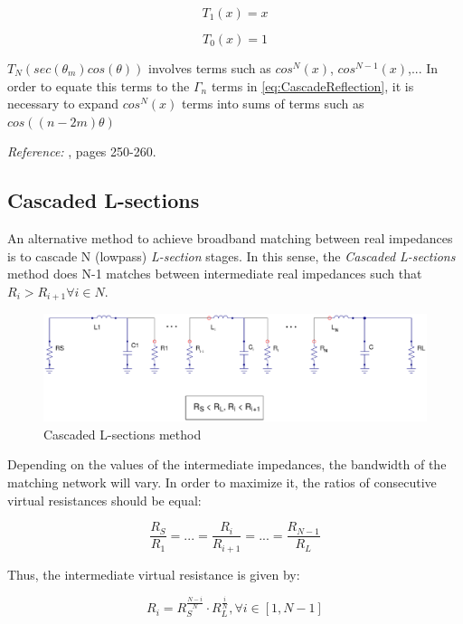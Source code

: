 \begin{equation}
T_1(x) = x
\end{equation}

\begin{equation}
T_0(x) = 1
\end{equation}

\noindent $T_N(sec(\theta_m)cos(\theta))$ involves terms such as $cos^N(x)$, $cos^{N-1}(x)$,... In order to equate this terms to the $\Gamma_n$ terms in \ref{eq:CascadeReflection}, it is necessary to expand $cos^N(x)$ terms into sums of terms such as $cos((n-2m)\theta)$

\noindent \textit{Reference:} \cite{Pozar}, pages 250-260.

\subsection{Cascaded L-sections}
An alternative method to achieve broadband matching between real impedances is to cascade N (lowpass) \textit{L-section} stages. In this sense, the \textit{Cascaded L-sections} method does N-1 matches between intermediate real impedances such that $R_i > R_{i+1} \forall i \in N$.

\begin{figure}[H]
\centering
\includegraphics[width=120mm]{CascadedLCsch}
\caption{Cascaded L-sections method}
\end{figure}

Depending on the values of the intermediate impedances, the bandwidth of the matching network will vary. In order to maximize it, the ratios of consecutive virtual resistances should be equal:

\begin{equation}
  \frac{R_S}{R_1} = ... = \frac{R_{i}}{R_{i+1}} = ... = \frac{R_{N-1}}{R_{L}}
\end{equation}

\noindent Thus, the intermediate virtual resistance is given by:

\begin{equation}
R_i = R_S^{\frac{N-i}{N}} \cdot R_L^{\frac{i}{N}}, \forall i \in [1, N-1]
\end{equation}


